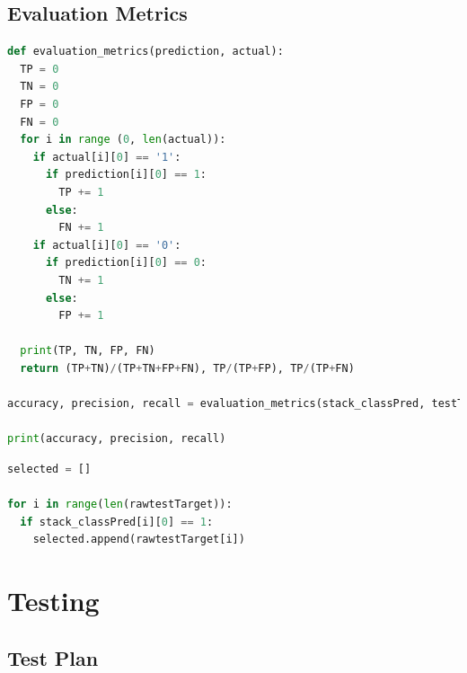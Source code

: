 \documentclass[10pt,onecolumn,letterpaper]{article}
\begin{document}
\subsection{Evaluation Metrics} 

\begin{lstlisting}[language=Python, breaklines=true]
def evaluation_metrics(prediction, actual):
  TP = 0
  TN = 0
  FP = 0
  FN = 0
  for i in range (0, len(actual)):
    if actual[i][0] == '1':
      if prediction[i][0] == 1:
        TP += 1
      else:
        FN += 1
    if actual[i][0] == '0':
      if prediction[i][0] == 0:
        TN += 1
      else: 
        FP += 1
     
  print(TP, TN, FP, FN)
  return (TP+TN)/(TP+TN+FP+FN), TP/(TP+FP), TP/(TP+FN)

accuracy, precision, recall = evaluation_metrics(stack_classPred, testTarget)

print(accuracy, precision, recall)
\end{lstlisting} 

\begin{lstlisting}[language=Python, breaklines=true]
selected = []

for i in range(len(rawtestTarget)):
  if stack_classPred[i][0] == 1: 
    selected.append(rawtestTarget[i])
\end{lstlisting} 

\newpage

\section{Testing}

\subsection{Test Plan} 
\end{document}
